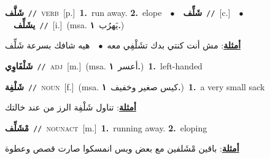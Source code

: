\documentclass[10pt,a4paper,twoside]{article} %
\begin{document}
\begin{multicols}{2}
{\setlength\topsep{0pt}\textbf{\foreignlanguage{arabic}{شَلَّف}}\ {\color{gray}\texttt{//}\color{black}}\ \textsc{verb}\ [p.]\ \textbf{1.}~run away.  \textbf{2.}~elope\ \ $\bullet$\ \ \setlength\topsep{0pt}\textbf{\foreignlanguage{arabic}{شَلِّف}}\ {\color{gray}\texttt{//}\color{black}}\ [c.]\ \ $\bullet$\ \ \setlength\topsep{0pt}\textbf{\foreignlanguage{arabic}{يشَلِّف}}\ {\color{gray}\texttt{//}\color{black}}\ [i.]\ \color{gray}(msa. \foreignlanguage{arabic}{يَهرُب}~\foreignlanguage{arabic}{\textbf{١.}})\color{black}\  \begin{flushright}\color{gray}\foreignlanguage{arabic}{\textbf{\underline{\foreignlanguage{arabic}{أمثلة}}}: مش أنت كنتي بدك تشَلْفِي معه\ $\bullet$\ \  هيه شافك بسرعة شَلِّف}\end{flushright}\color{black}} \vspace{2mm}

{\setlength\topsep{0pt}\textbf{\foreignlanguage{arabic}{شَلْفَاوِي}}\ {\color{gray}\texttt{//}\color{black}}\ \textsc{adj}\ [m.]\ \color{gray}(msa. \foreignlanguage{arabic}{أعسر}~\foreignlanguage{arabic}{\textbf{١.}})\color{black}\ \textbf{1.}~left-handed\ } \vspace{2mm}

{\setlength\topsep{0pt}\textbf{\foreignlanguage{arabic}{شَلْفِة}}\ {\color{gray}\texttt{//}\color{black}}\ \textsc{noun}\ [f.]\ \color{gray}(msa. \foreignlanguage{arabic}{كيس صغير وخفيف}~\foreignlanguage{arabic}{\textbf{١.}})\color{black}\ \textbf{1.}~a very small sack\  \begin{flushright}\color{gray}\foreignlanguage{arabic}{\textbf{\underline{\foreignlanguage{arabic}{أمثلة}}}: تناول شَلْفِة الرز من عند خالتك}\end{flushright}\color{black}} \vspace{2mm}

{\setlength\topsep{0pt}\textbf{\foreignlanguage{arabic}{مْشَلِّف}}\ {\color{gray}\texttt{//}\color{black}}\ \textsc{noun\textunderscore act}\ [m.]\ \textbf{1.}~running away.  \textbf{2.}~eloping\  \begin{flushright}\color{gray}\foreignlanguage{arabic}{\textbf{\underline{\foreignlanguage{arabic}{أمثلة}}}: باقين مْشَلفين مع بعض وبس انمسكوا صارت قصص وعطوة}\end{flushright}\color{black}} \vspace{2mm}


\end{multicols}
\end{document}
